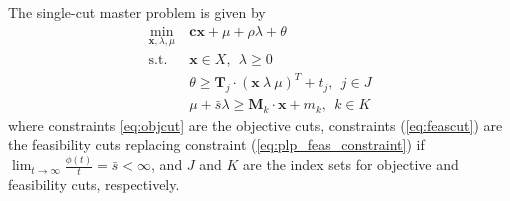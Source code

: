 \documentclass[opre,nonblindrev]{informs3} %
\newcommand{\x}{\mathbf{x}}
\renewcommand{\c}{\mathbf{c}}
\newcommand{\T}{\mathbf{T}}
\newcommand{\M}{\mathbf{M}}
\newcommand{\st}{\mbox{s.t.}}
\begin{document}
The single-cut master problem is given by
\begin{align}
	\min_{\x,\lambda,\mu} \ & \c\x + \mu + \rho \lambda + \theta \label{eq:master_problem}\\
	\st \ & \x \in X,\ \ \lambda \geq 0 \nonumber  \\
	& \theta \geq \T_j \cdot (\x\ \lambda\ \mu)^T + t_j, \ \  j \in J  \label{eq:objcut} \\
	& \mu + \bar{s}\lambda \geq \M_k \cdot \x + m_k, \ \ k \in K \label{eq:feascut} 
\end{align}
where constraints \eqref{eq:objcut} are the objective cuts, constraints  (\ref{eq:feascut}) are the feasibility cuts replacing constraint (\ref{eq:plp_feas_constraint}) if $\lim_{t \rightarrow \infty} \frac{\phi(t)}{t} =\bar{s} < \infty$, and $J$ and $K$ are the index sets for objective and feasibility cuts, respectively.
\smallskip
\end{document}
